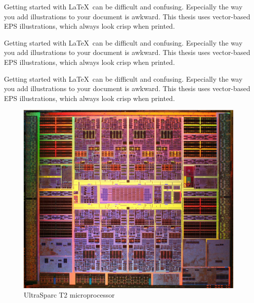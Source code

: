 Getting started with \LaTeX\ can be difficult and confusing. Especially the way you add illustrations to your document is awkward. This thesis uses vector-based EPS illustrations, which always look crisp when printed.

Getting started with \LaTeX\ can be difficult and confusing. Especially the way you add illustrations to your document is awkward. This thesis uses vector-based EPS illustrations, which always look crisp when printed.

Getting started with \LaTeX\ can be difficult and confusing. Especially the way you add illustrations to your document is awkward. This thesis uses vector-based EPS illustrations, which always look crisp when printed.

\begin{figure}%
\centering%
\includegraphics[width=.7\textwidth]{demopic}%
\caption{UltraSparc T2 microprocessor}%
\label{FIG RTG}%
\end{figure} 